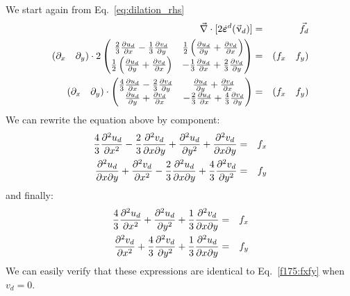 We start again from Eq.~\eqref{eq:dilation_rhs}
\begin{eqnarray}
\vec\nabla \cdot [2  \dot{\bm \varepsilon}^d(\vec\upnu_d)  ]  &=& \vec{f}_d \nonumber\\
(\partial_x \quad \partial_y) \cdot 
2
\begin{pmatrix}
\frac23 \frac{\partial u_d}{\partial x} - \frac13 \frac{\partial v_d}{\partial y} 
&  \frac12 \left(  \frac{\partial u_d}{\partial y} + \frac{\partial v_d}{\partial x} \right)  \\
\frac12 \left(  \frac{\partial u_d}{\partial y} + \frac{\partial v_d}{\partial x} \right)  
& -\frac13 \frac{\partial u_d}{\partial x} + \frac23 \frac{\partial v_d}{\partial y}
\end{pmatrix}
&=&(f_x \quad f_y) \nonumber\\
(\partial_x \quad \partial_y) \cdot 
\begin{pmatrix}
\frac43 \frac{\partial u_d}{\partial x} - \frac23 \frac{\partial v_d}{\partial y} 
&  \frac{\partial u_d}{\partial y} + \frac{\partial v_d}{\partial x}   \\
  \frac{\partial u_d}{\partial y} + \frac{\partial v_d}{\partial x} 
& -\frac23 \frac{\partial u_d}{\partial x} + \frac43 \frac{\partial v_d}{\partial y}
\end{pmatrix}
&=&(f_x \quad f_y)
\end{eqnarray}
We can rewrite the equation above by component:
\begin{eqnarray}
\frac43 \frac{\partial^2 u_d}{\partial x^2} - \frac23 \frac{\partial^2 v_d}{\partial x \partial y} 
+ \frac{\partial^2 u_d}{\partial y^2} + \frac{\partial^2 v_d}{\partial x \partial y} &=& f_x 
\nonumber\\
\frac{\partial^2 u_d}{\partial x\partial y} + \frac{\partial^2 v_d}{\partial x^2}
-\frac23 \frac{\partial^2 u_d}{\partial x \partial y} + \frac43 \frac{\partial^2 v_d}{\partial y^2} &=& f_y \nonumber
 \end{eqnarray}
and finally:
\begin{eqnarray}
\frac43 \frac{\partial^2 u_d}{\partial x^2} + \frac{\partial^2 u_d}{\partial y^2} 
+ \frac13 \frac{\partial^2 v_d}{\partial x \partial y}  &=& f_x 
\nonumber\\
\frac{\partial^2 v_d}{\partial x^2}
+ \frac43 \frac{\partial^2 v_d}{\partial y^2} 
+ \frac13\frac{\partial^2 u_d}{\partial x\partial y} 
&=& f_y \nonumber
\end{eqnarray}
We can easily verify that these expressions are identical to 
Eq.~\eqref{f175:fxfy} when $v_d=0$.

